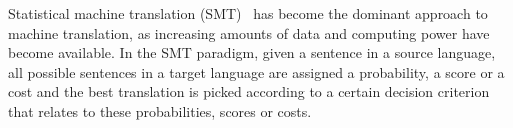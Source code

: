 








Statistical machine
translation (SMT)~\citep{lopez:2008:ACMComputingSurveys,koehn:2010:book}
has become the dominant approach to machine translation, as increasing
amounts of data and computing power have become available.
In the SMT paradigm, given a sentence in a source language, all
possible sentences in a target language are assigned a probability, a
score or a cost and the best translation is picked according to a certain
decision criterion that relates to these probabilities, scores or costs.

